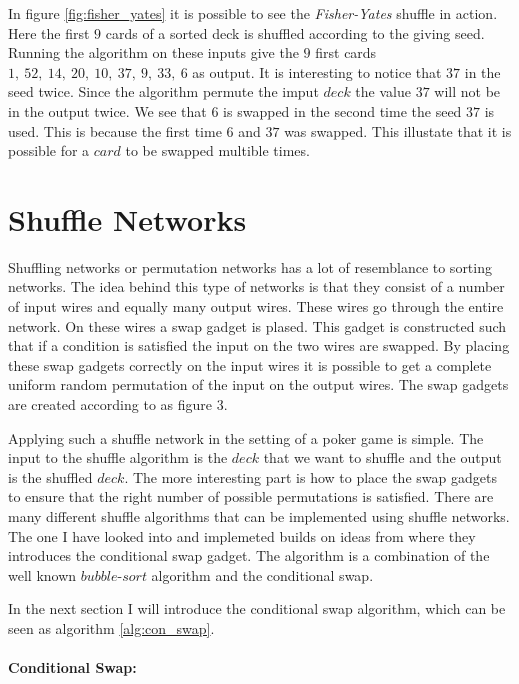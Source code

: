 \documentclass[twoside,11pt,openright]{report}
\newcommand{\FY}{\textit{Fisher-Yates} }
\begin{document}
In figure \ref{fig:fisher_yates} it is possible to see the \FY shuffle in action. Here the first $9$ cards of a sorted deck is shuffled according to the giving seed. Running the algorithm on these inputs give the $9$ first cards $1,~52,~14,~20,~10,~37,~9,~33,~6$ as output. It is interesting to notice that $37$ in the seed twice. Since the algorithm permute the imput $deck$ the value $37$ will not be in the output twice. We see that $6$ is swapped in the second time the seed $37$ is used. This is because the first time $6$ and $37$ was swapped. This illustate that it is possible for a $card$ to be swapped multible times.


\section{Shuffle Networks}
Shuffling networks or permutation networks has a lot of resemblance to sorting networks. The idea behind this type of networks is that they consist of a number of input wires and equally many output wires. These wires go through the entire network. On these wires a swap gadget is plased. This gadget is constructed such that if a condition is satisfied the input on the two wires are swapped. By placing these swap gadgets correctly on the input wires it is possible to get a complete uniform random permutation of the input on the output wires. The swap gadgets are created according to  as figure 3.

Applying such a shuffle network in the setting of a poker game is simple. The input to the shuffle algorithm is the $deck$ that we want to shuffle and the output is the shuffled $deck$. The more interesting part is how to place the swap gadgets to ensure that the right number of possible permutations is satisfied. There are many different shuffle algorithms that can be implemented using shuffle networks. The one I have looked into and implemeted builds on ideas from  where they introduces the conditional swap gadget. The algorithm is a combination of the well known $bubble\text{-}sort$ algorithm and the conditional swap.

\bigskip

In the next section I will introduce the conditional swap algorithm, which can be seen as algorithm \ref{alg:con_swap}.

\bigskip

\paragraph{Conditional Swap:}
\label{sec:con_swap}
\end{document}
